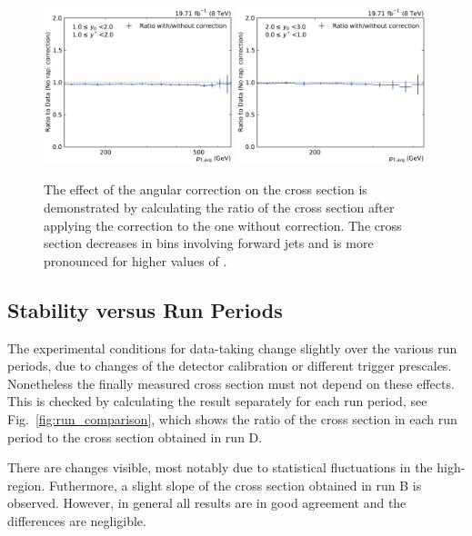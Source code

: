 \begin{figure}[htbp]
    \includegraphics[width=0.49\textwidth]{figures/measurement/rap_corr_data_yb1ys1.pdf}\hfill
    \includegraphics[width=0.49\textwidth]{figures/measurement/rap_corr_data_yb2ys0.pdf}
    \caption[Effect of angular correction]{The effect of the angular correction
        on the cross section  is demonstrated by calculating the ratio of the
        cross section after applying the correction to the one without
        correction. The cross section decreases in bins involving forward jets
        and is more pronounced for higher values of \ystar.}
    \label{fig:rap_corr_data}
\end{figure}

\subsection{Stability versus Run Periods}

The experimental conditions for data-taking change slightly over the various run
periods, due to changes of the detector calibration or different trigger
prescales. Nonetheless the finally measured cross section must not depend on
these effects. This is checked by calculating the result separately for each run
period, see Fig.~\ref{fig:run_comparison}, which shows the ratio of the cross
section in each run period to the cross section obtained in run D. 

There are changes visible, most notably due to statistical fluctuations in the
high-\pt region. Futhermore, a slight slope of the cross section obtained in run
B is observed. However, in general all results are in good agreement and the
differences are negligible.

